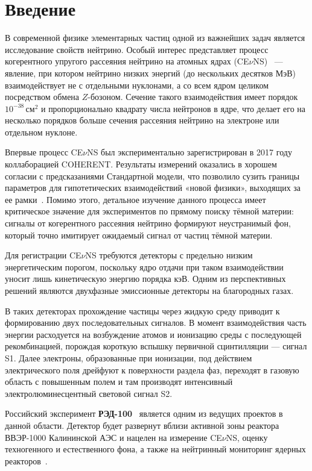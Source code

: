 \documentclass[12pt]{article}
\begin{document}
\newpage
\section*{Введение}

В современной физике элементарных частиц одной из важнейших задач является
исследование свойств нейтрино. Особый интерес представляет процесс
когерентного упругого рассеяния нейтрино на атомных ядрах
(CE$\nu$NS)~\cite{Freedman1974} — явление, при котором нейтрино низких
энергий (до нескольких десятков МэВ) взаимодействует не с отдельными
нуклонами, а со всем ядром целиком посредством обмена $Z$-бозоном. Сечение
такого взаимодействия имеет порядок $10^{-38}$\,см$^2$ и пропорционально
квадрату числа нейтронов в ядре, что делает его на несколько порядков
больше сечения рассеяния нейтрино на электроне или отдельном нуклоне.

Впервые процесс CE$\nu$NS был экспериментально зарегистрирован в 2017 году коллаборацией COHERENT. Результаты измерений оказались в хорошем согласии с предсказаниями Стандартной модели, что позволило сузить границы параметров для гипотетических взаимодействий «новой физики», выходящих за ее рамки~\cite{VanDessel2020}. Помимо этого, детальное изучение данного процесса имеет критическое значение для экспериментов по прямому поиску тёмной материи: сигналы от когерентного рассеяния нейтрино формируют неустранимый фон, который точно имитирует ожидаемый сигнал от частиц тёмной материи.

Для регистрации CE$\nu$NS требуются детекторы с предельно низким
энергетическим порогом, поскольку ядро отдачи при таком взаимодействии
уносит лишь кинетическую энергию порядка кэВ. Одним из перспективных
решений являются двухфазные эмиссионные детекторы на благородных газах.

В таких детекторах прохождение частицы через жидкую среду приводит к формированию двух последовательных сигналов. В момент взаимодействия часть энергии расходуется на возбуждение атомов и ионизацию среды с последующей рекомбинацией, порождая короткую вспышку первичной сцинтилляции — сигнал S1. Далее электроны, образованные при ионизации, под действием электрического поля дрейфуют к поверхности раздела фаз, переходят в газовую область с повышенным полем и там производят интенсивный электролюминесцентный световой сигнал S2.

Российский эксперимент \textbf{РЭД-100}~\cite{Akimov2022_RED100} является
одним из ведущих проектов в данной области. Детектор будет развернут вблизи
активной зоны реактора ВВЭР-1000 Калининской АЭС и нацелен на измерение
CE$\nu$NS, оценку техногенного и естественного фона, а также на
нейтринный мониторинг ядерных реакторов~\cite{Skorokhvatov2003}.
\end{document}
